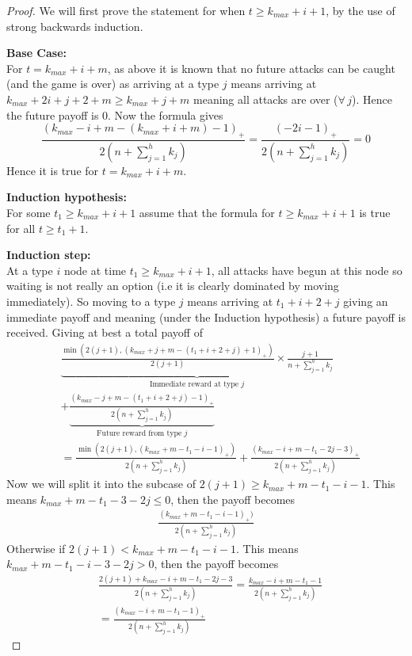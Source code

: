\documentclass[a4paper,10pt]{article}
\newcommand{\denominator}{\ensuremath{n+\sum\limits_{j=1}^{h} k_{j}}}
\newcommand{\pospart}[1]{\left( #1 \right)_{+}}
\theoremstyle{definition}
\theoremstyle{definition}
\theoremstyle{remark}
\theoremstyle{definition}
\begin{document}
\begin{proof}
We will first prove the statement for when $t \geq k_{max}+i+1$, by the use of strong backwards induction.

\textbf{Base Case:}
\\
For $t=k_{max}+i+m$, as above it is known that no future attacks can be caught (and the game is over) as arriving at a type $j$ means arriving at $k_{max}+2i+j+2+m \geq k_{max}+j+m$ meaning all attacks are over ($\forall \, j$). Hence the future payoff is $0$.
Now the formula gives $$\frac{\pospart{k_{max}-i+m-(k_{max}+i+m)-1}}{2 \left( \denominator \right)}=\frac{\pospart{-2i-1}}{2 \left( \denominator \right)}=0$$
Hence it is true for $t=k_{max}+i+m$.

\textbf{Induction hypothesis:}
\\
For some $t_{1} \geq k_{max}+i+1$ assume that the formula for $t \geq k_{max}+i+1$ is true for all $t \geq t_{1} +1$.

\textbf{Induction step:}
\\
At a type $i$ node at time $t_{1} \geq k_{max}+i+1$, all attacks have begun at this node so waiting is not really an option (i.e it is clearly dominated by moving immediately). So moving to a type $j$ means arriving at $t_{1}+i+2+j$ giving an immediate payoff and meaning (under the Induction hypothesis) a future payoff is received. Giving at best a total payoff of
\begin{align*}
&\underbrace{\frac{\min (2(j+1), \pospart{k_{max}+j+m-(t_{1}+i+2+j)+1})}{2(j+1)} \times \frac{j+1}{\denominator}}_{\text{Immediate reward at type } j} \\
&+\underbrace{\frac{\pospart{k_{max}-j+m-(t_{1}+i+2+j)-1}}{2 \left( \denominator \right)}}_{\text{Future reward from type } j} \\
&=\frac{\min (2(j+1), \pospart{k_{max}+m-t_{1}-i-1})}{2 \left( \denominator \right)}
+\frac{\pospart{k_{max}-i+m-t_{1}-2j-3}}{2 \left( \denominator \right)}
\end{align*}
Now we will split it into the subcase of $2(j+1) \geq k_{max}+m-t_{1}-i-1$. This means $k_{max}+m-t_{1}-3-2j \leq 0$, then the payoff becomes
\begin{align*}
\frac{\pospart{k_{max}+m-t_{1}-i-1})}{2 \left( \denominator \right)}
\end{align*}
Otherwise if $2(j+1) < k_{max}+m-t_{1}-i-1$. This means $k_{max}+m-t_{1}-i-3-2j > 0$, then the payoff becomes
\begin{align*}
&\frac{2(j+1)+k_{max}-i+m-t_{1}-2j-3}{2 \left( \denominator \right)}=\frac{k_{max}-i+m-t_{1}-1}{2 \left( \denominator \right)} \\
&=\frac{\pospart{k_{max}-i+m-t_{1}-1}}{2 \left( \denominator \right)}
\end{align*}


\end{proof}
\end{document}
